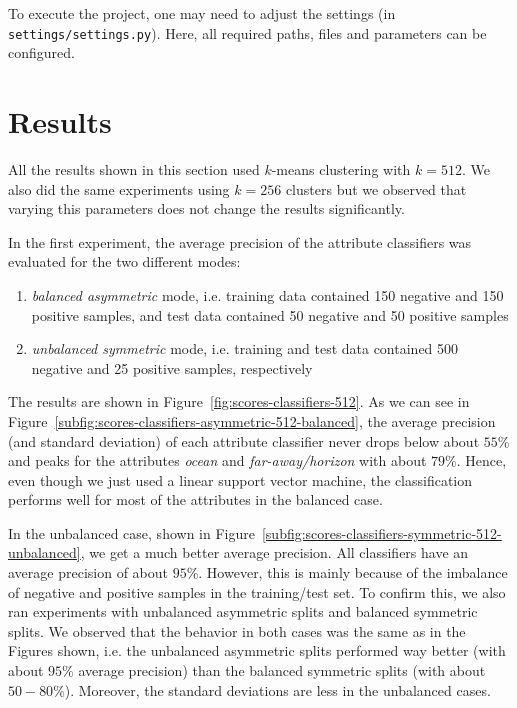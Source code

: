 \documentclass{vldb}
\begin{document}
To execute the project, one may need to adjust the settings (in
\texttt{settings/settings.py}). Here, all required paths, files and parameters
can be configured.

\section{Results}
\label{sec:results}
All the results shown in this section used $k$-means clustering with $k = 512$.
We also did the same experiments using $k = 256$ clusters but we observed that
varying this parameters does not change the results significantly.

In the first experiment, the average precision of the attribute classifiers was
evaluated for the two different modes:
\begin{enumerate}
  \item \emph{balanced asymmetric} mode, i.e. training data contained 150 negative
    and 150 positive samples, and test data contained 50 negative and 50
    positive samples
  \item \emph{unbalanced symmetric} mode, i.e. training and test data contained
    500 negative and 25 positive samples, respectively
\end{enumerate}

The results are shown in Figure~\ref{fig:scores-classifiers-512}. As we can see
in Figure~\ref{subfig:scores-classifiers-asymmetric-512-balanced}, the average
precision (and standard deviation) of each attribute classifier never drops below
about $55$\% and peaks for the attributes \emph{ocean} and \emph{far-away/horizon}
with about $79$\%. Hence, even though we just used a linear support vector
machine, the classification performs well for most of the attributes in the
balanced case.

In the unbalanced case, shown in 
Figure~\ref{subfig:scores-classifiers-symmetric-512-unbalanced}, we get a much
better average precision. All classifiers have an average precision of about
$95$\%. However, this is mainly because of the imbalance of negative and positive
samples in the training/test set. To confirm this, we also ran experiments with
unbalanced asymmetric splits and balanced symmetric splits. We observed that the
behavior in both cases was the same as in the Figures shown, i.e. the unbalanced
asymmetric splits performed way better (with about $95$\% average precision)
than the balanced symmetric splits (with about $50 - 80$\%). Moreover, the
standard deviations are less in the unbalanced cases.
\end{document}

